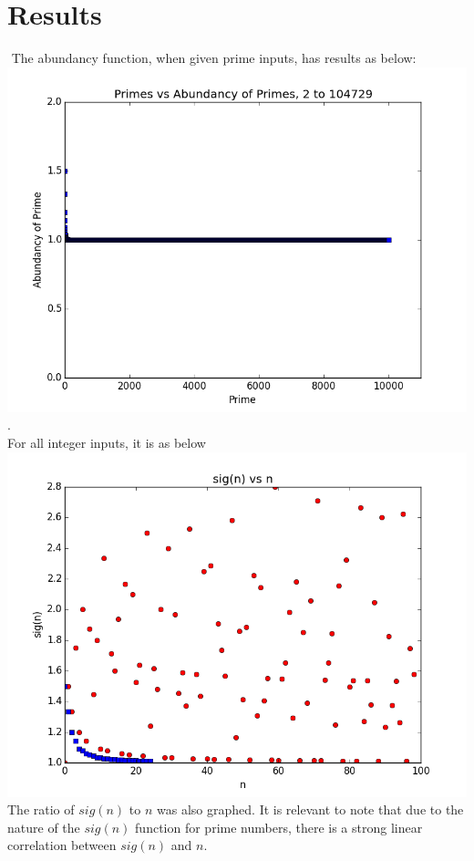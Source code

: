 \documentclass[11pt]{article}
\begin{document}
\section{Results}$ $
The abundancy function, when given prime inputs, has results as below:
\includegraphics[scale=0.5]{figure_1.png}. 
\\ For all integer inputs, it is as below \\
\includegraphics[scale=0.5]{with_primes_small.png}
\\ The ratio of $sig(n)$ to $n$ was also graphed. It is relevant to note that due to the nature of the $sig(n)$ function for prime numbers, there is a strong linear correlation between $sig(n)$ and $n$.
\end{document}
